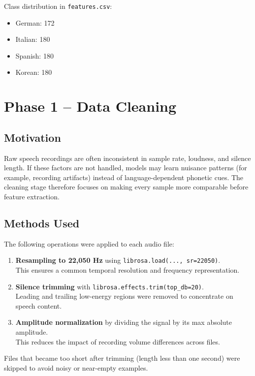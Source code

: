 \documentclass[a4paper,14pt]{extarticle}
\begin{document}
Class distribution in \texttt{features.csv}:
\begin{itemize}
    \item German: 172
    \item Italian: 180
    \item Spanish: 180
    \item Korean: 180
\end{itemize}

\newpage
\section{Phase 1 -- Data Cleaning}

\subsection{Motivation}
Raw speech recordings are often inconsistent in sample rate, loudness, and silence length. If these factors are not handled, models may learn nuisance patterns (for example, recording artifacts) instead of language-dependent phonetic cues. The cleaning stage therefore focuses on making every sample more comparable before feature extraction.

\subsection{Methods Used}
The following operations were applied to each audio file:
\begin{enumerate}
    \item \textbf{Resampling to 22,050 Hz} using \texttt{librosa.load(..., sr=22050)}.\\
    This ensures a common temporal resolution and frequency representation.
    \item \textbf{Silence trimming} with \texttt{librosa.effects.trim(top\_db=20)}.\\
    Leading and trailing low-energy regions were removed to concentrate on speech content.
    \item \textbf{Amplitude normalization} by dividing the signal by its max absolute amplitude.\\
    This reduces the impact of recording volume differences across files.
\end{enumerate}

Files that became too short after trimming (length less than one second) were skipped to avoid noisy or near-empty examples.
\end{document}
